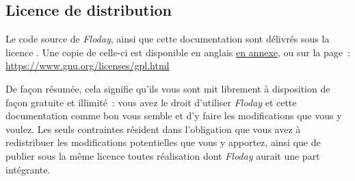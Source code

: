 \subsection{Licence de distribution}

Le code source de \emph{Floday}, ainsi que cette documentation sont délivrés sous la licence .
Une copie de celle-ci est disponible en anglais \hyperref[sec:gpl]{en annexe}, ou sur la page~: \url{https://www.gnu.org/licenses/gpl.html}

De façon résumée, cela signifie qu'ils vous sont mit librement à disposition de façon gratuite et illimité~: vous avez le droit d'utiliser \emph{Floday} et cette documentation comme bon vous semble et d'y faire les modifications que vous y voulez.
Les seuls contraintes résident dans l'obligation que vous avez à redistribuer les modifications potentielles que vous y apportez, ainsi que de publier sous la même licence toutes réalisation dont \emph{Floday} aurait une part intégrante.
